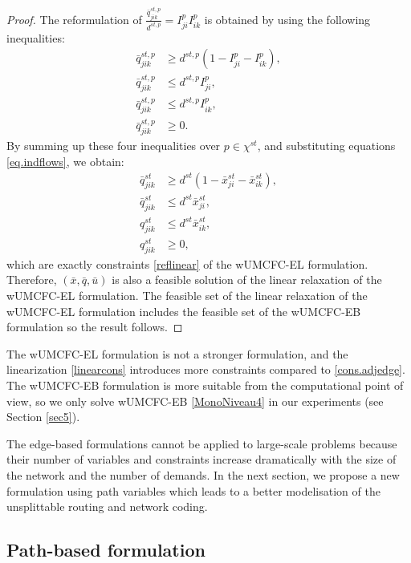 \begin{proof}
The reformulation of \(\frac{ \bar{q}^{st,p}_{jik} }{d^{st,p}} =  I^p_{ji} I^p_{ik}\) is obtained by using the following inequalities:
\begin{equation}
\label{linear}
\begin{split}
    \bar{q}^{st,p}_{jik} &\ge d^{st,p} (1 -  I^p_{ji} - I^p_{ik}),\\
   \bar{q}^{st,p}_{jik} &\le d^{st,p} I^p_{ji}, \\
  \bar{q}^{st,p}_{jik}  &\le d^{st,p} I^p_{ik},\\
    \bar{q}^{st,p}_{jik} & \ge 0.
\end{split}
\end{equation}
By summing up these four inequalities over \(p \in \chi^{st}\), and substituting equations \eqref{eq.indflows}, we obtain:
\begin{equation}
\begin{split}
    \bar{q}^{st}_{jik} &\ge d^{st} (1 - \bar{x}^{st}_{ji} - \bar{x}^{st}_{ik}),\\
    \bar{q}^{st}_{jik} &\le d^{st}  \bar{x}^{st}_{ji}, \\
   q^{st}_{jik} &\le d^{st}  \bar{x}^{st}_{ik},\\
   q^{st}_{jik} & \ge 0,
\end{split}
\end{equation}
which are exactly constraints \eqref{reflinear} of the wUMCFC-EL  formulation. Therefore, \((\bar{x}, \bar{q}, \bar{u})\) is also a feasible solution of the linear relaxation of the wUMCFC-EL formulation. The feasible  set of the linear relaxation of the wUMCFC-EL formulation includes the feasible  set of the wUMCFC-EB formulation so the result follows.
\end{proof}

The wUMCFC-EL formulation is not a stronger formulation, and the linearization \eqref{linearcons} introduces more constraints compared to \eqref{cons.adjedge}. The wUMCFC-EB formulation is more suitable from the computational point of view, so
 we only solve wUMCFC-EB \eqref{MonoNiveau4} in our experiments (see Section \ref{sec5}).
 
 The edge-based formulations cannot be applied to large-scale problems because their number of variables and constraints increase dramatically with the size of the network and the number of demands. In the next section, we propose a new formulation using path variables which leads to a better modelisation of the unsplittable routing and network coding. 

\subsection{Path-based formulation}

